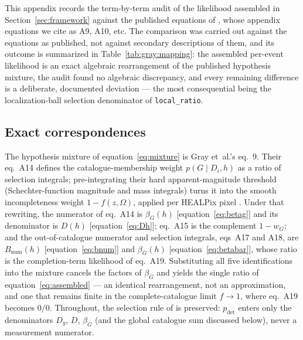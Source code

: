 This appendix records the term-by-term audit of the likelihood
assembled in Section~\ref{sec:framework} against the published
equations of \citet{Gray:2019ksv}, whose appendix equations we cite as
A9, A10, etc.  The comparison was carried out against the equations as
published, not against secondary descriptions of them, and its outcome
is summarized in Table~\ref{tab:gray:mapping}: the assembled per-event
likelihood is an exact algebraic rearrangement of the published
hypothesis mixture, the audit found no algebraic discrepancy, and
every remaining difference is a deliberate, documented deviation ---
the most consequential being the localization-ball selection
denominator of \texttt{local\_ratio}.

\subsection{Exact correspondences}
\label{sec:app:gray:exact}

The hypothesis mixture of equation~\eqref{eq:mixture} is Gray
et~al.'s eq.~9.  Their eq.~A14 defines the catalogue-membership weight
$p(G \mid D_i, h)$ as a ratio of selection integrals; pre-integrating
their hard apparent-magnitude threshold (Schechter-function magnitude
and mass integrals) turns it into the smooth incompleteness weight
$1 - f(z,\Omega)$, applied per HEALPix pixel
\citep{Gray:2021sew}.
Under that rewriting, the numerator of eq.~A14 is
$\beta_G(h)$ [equation~\eqref{eq:betag}] and its denominator is
$D(h)$ [equation~\eqref{eq:Dh}]; eq.~A15 is the complement
$1 - w_G$; and the out-of-catalogue numerator and selection integrals,
eqs~A17 and A18, are $B_\mathrm{num}(h)$
[equation~\eqref{eq:bnum}] and $\beta_{\bar G}(h)$
[equation~\eqref{eq:betabar}], whose ratio is the completion-term
likelihood of eq.~A19.  Substituting all five identifications into
the mixture cancels the factors of $\beta_{\bar G}$ and yields the
single ratio of equation~\eqref{eq:assembled} --- an identical
rearrangement, not an approximation, and one that remains finite in
the complete-catalogue limit $f \to 1$, where eq.~A19 becomes $0/0$.
Throughout, the selection rule of \citet{Mandel:2018mve} is preserved:
$p_\mathrm{det}$ enters only the denominators $D_g$, $D$,
$\beta_{\bar G}$ (and the global catalogue sum discussed below), never
a measurement numerator.


